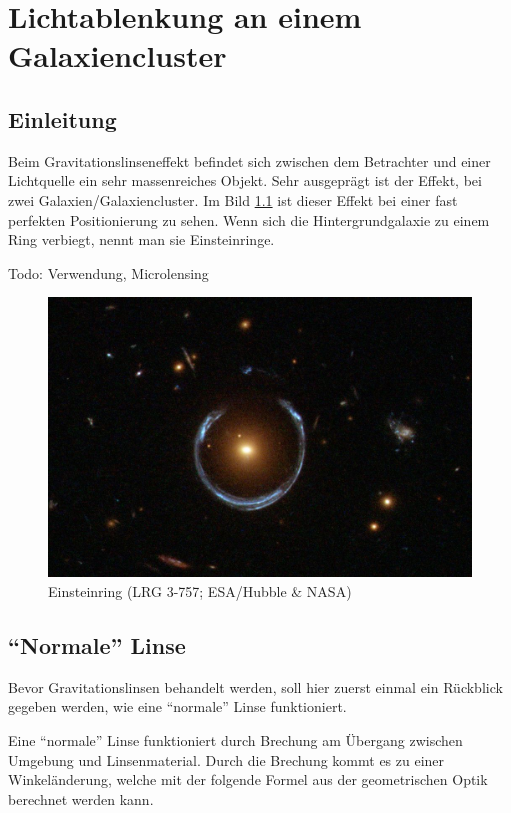 \chapter{Lichtablenkung an einem Galaxiencluster\label{chapter:thema}}
\begin{refsection}

\section{Einleitung}
Beim Gravitationslinseneffekt befindet sich zwischen dem Betrachter
und einer Lichtquelle ein sehr massenreiches Objekt.  Sehr ausgeprägt
ist der Effekt, bei zwei Galaxien/Galaxiencluster.  Im Bild
\ref{fig:lrg3-757} ist dieser Effekt bei einer fast perfekten
Positionierung zu sehen.  Wenn sich die Hintergrundgalaxie zu einem
Ring verbiegt, nennt man sie Einsteinringe.

Todo: Verwendung, Microlensing

\begin{figure}
  \centering
  \includegraphics[width=\textwidth]{cluster/images/LRG_3-757}
  \caption{Einsteinring (LRG 3-757; ESA/Hubble \& NASA)}
  \label{fig:lrg3-757}
\end{figure}

\section{``Normale'' Linse}
Bevor Gravitationslinsen behandelt werden, soll hier zuerst einmal ein
Rückblick gegeben werden, wie eine ``normale'' Linse funktioniert.

Eine ``normale'' Linse funktioniert durch Brechung am Übergang
zwischen Umgebung und Linsenmaterial.  Durch die Brechung kommt es zu
einer Winkeländerung, welche mit der folgende Formel aus der
geometrischen Optik berechnet werden kann.


\end{refsection}
